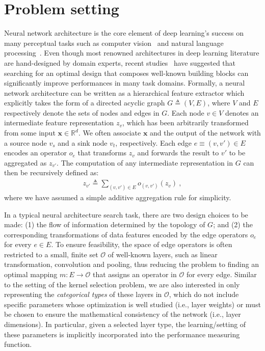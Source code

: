 \label{c5:nas}
\section{Problem setting}
Neural network architecture is the core element of deep learning's success on many perceptual tasks such as computer vision~\cite{lecun2015lenet} and natural language processing~\cite{vaswani2017attention}. Even though most renowned architectures in deep learning literature are hand-designed by domain experts, recent studies~\cite{zoph2016,hu2020,xie2018} have suggested that searching for an optimal design that composes well-known building blocks can significantly improve performances in many task domains. Formally, a neural network architecture can be written as a hierarchical feature extractor which explicitly takes the form of a directed acyclic graph $G\triangleq(V, E)$, where $V$ and $E$ respectively denote the sets of nodes and edges in $G$. Each node $v\in V$ denotes an intermediate feature representation $z_v$, which has been arbitrarily transformed from some input $\mathbf{x} \in \mathbb{R}^d$. We often associate $\mathbf{x}$ and the output of the network with a source node $v_s$ and a sink node $v_t$, respectively. Each edge $e \equiv (v,v') \in E$ encodes an operator $o_e$ that transforms $z_v$ and forwards the result to $v'$ to be aggregated as $z_{v'}$. The computation of any intermediate representation in $G$ can then be recursively defined as:
\begin{eqnarray}
z_{v'} \triangleq \sum_{(v, v') \in E} o_{(v,v')}(z_v) \ ,
\end{eqnarray} 
where we have assumed a simple additive aggregation rule for simplicity. 

In a typical neural architecture search task, there are two design choices to be made: (1) the flow of information determined by the topology of $G$; and (2) the corresponding transformations of data features encoded by the edge operators $o_e$ for every $e \in E$. To ensure feasibility, the space of edge operators is often restricted to a small, finite set $\mathcal{O}$ of well-known layers, such as linear transformation, convolution and pooling, thus reducing the problem to finding an optimal mapping $m: E \rightarrow \mathcal{O}$ that assigns an operator in $\mathcal{O}$ for every edge. Similar to the setting of the kernel selection problem, we are also interested in only representing the \emph{categorical types} of these layers in $\mathcal{O}$, which do not include specific parameters whose optimization is well studied (i.e., layer weights) or must be chosen to ensure the mathematical consistency of the network (i.e., layer dimensions). In particular, given a selected layer type, the learning/setting of these parameters is implicitly incorporated into the performance measuring function.

